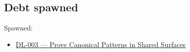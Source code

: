\subsection{Debt spawned}\label{record-169-debt-spawned}

Spawned:

\begin{itemize}
\tightlist
\item
  \href{https://github.com/flyingrobots/bijou/blob/cbd70612140e7a450d764b3c7be1c6af878b99bc/docs/method/graveyard/legacy-backlog/DL-003-prove-canonical-patterns-in-shared-surfaces.md}{DL-003 --- Prove Canonical Patterns in Shared Surfaces}
\end{itemize}


